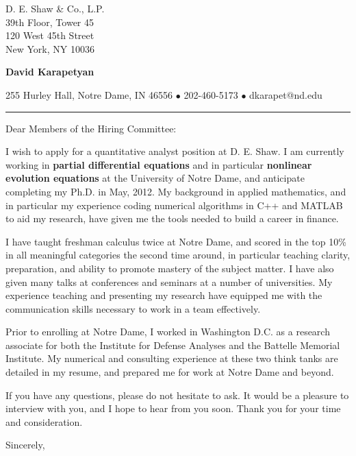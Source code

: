 \documentclass[12pt]{letter}
\date{\vspace{0.5cm}\flushleft \today}
\begin{document}
\begin{letter}{D. E. Shaw \& Co., L.P. \\
39th Floor, Tower 45 \\
120 West 45th Street \\
New York, NY 10036
}
    \begin{center}
{\bf {\Large David Karapetyan}}
\end{center}

\begin{center}
{255 Hurley Hall, Notre Dame, IN 46556  $\bullet$
202-460-5173 $\bullet$ dkarapet@nd.edu
}
\end{center}
\hrule

\opening{Dear Members of the Hiring Committee:\\}
%
%
I wish to apply for a quantitative analyst position at D. E. Shaw. I am
currently working in \textbf{partial differential equations} and in particular
\textbf{nonlinear evolution equations} at the University of Notre Dame, and 
anticipate completing my Ph.D. in May, 2012. My
background in applied mathematics, and in particular my experience coding
numerical algorithms in C++ and MATLAB to aid my research, have given me the
tools needed to build a career in finance.

I have taught freshman calculus twice at Notre Dame, and scored in the top 10\%
in all meaningful categories the second time around, in particular teaching
clarity, preparation, and ability to promote mastery of the subject matter. I
have also given many talks at conferences and seminars at a number of
universities. My experience teaching and presenting my research have equipped
me with the communication skills necessary to work in a team effectively. 

Prior to enrolling at Notre Dame, I worked in Washington D.C. as a research
associate for both the Institute for Defense Analyses and the Battelle Memorial
Institute. My numerical and consulting experience at these two think tanks are
detailed in my resume, and prepared me for work at Notre Dame and beyond. 

If you have any questions, please do not hesitate to ask. It would be a
pleasure to interview with you, and I hope to hear from you soon. Thank you for
your time and consideration. 

\closing{Sincerely,}


\end{letter}
\end{document}
